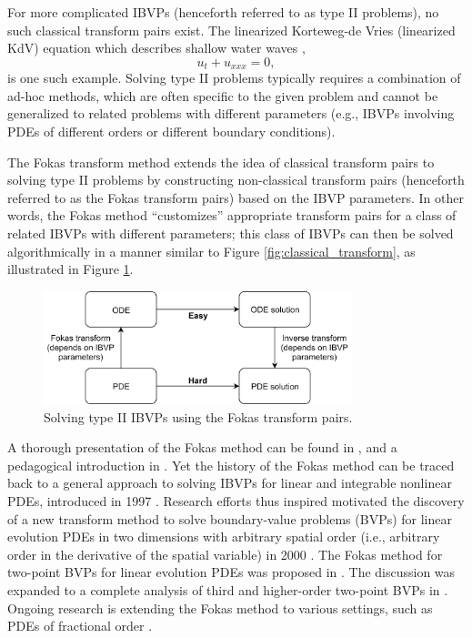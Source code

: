 \documentclass[12pt, oneside, a4paper]{article}
\begin{document}
For more complicated IBVPs (henceforth referred to as type II problems), no such classical transform pairs exist. The linearized Korteweg-de Vries (linearized KdV) equation which describes shallow water waves \cite{Korteweg1895},
\begin{equation}\label{eq:linearied_kdv}
    u_t + u_{xxx} = 0,
\end{equation}
is one such example. Solving type II problems typically requires a combination of ad-hoc methods, which are often specific to the given problem and cannot be generalized to related problems with different parameters (e.g., IBVPs involving PDEs of different orders or different boundary conditions).

The Fokas transform method extends the idea of classical transform pairs to solving type II problems by constructing non-classical transform pairs (henceforth referred to as the Fokas transform pairs) based on the IBVP parameters. In other words, the Fokas method ``customizes'' appropriate transform pairs for a class of related IBVPs with different parameters; this class of IBVPs can then be solved algorithmically in a manner similar to Figure \ref{fig:classical_transform}, as illustrated in Figure \ref{fig:fokas_transform}.
\begin{figure}[htpb!]
    \centering
    \includegraphics[width=0.8\textwidth]{fokas_transform.png}
    \caption{Solving type II IBVPs using the Fokas transform pairs.}
    \label{fig:fokas_transform}
\end{figure}

A thorough presentation of the Fokas method can be found in \cite{Fokas2008}, and a pedagogical introduction in \cite{Deconinck2014}. Yet the history of the Fokas method can be traced back to a general approach to solving IBVPs for linear and integrable nonlinear PDEs, introduced in 1997 \cite{Fokas1997}. Research efforts thus inspired motivated the discovery of a new transform method to solve boundary-value problems (BVPs) for linear evolution PDEs in two dimensions with arbitrary spatial order (i.e., arbitrary order in the derivative of the spatial variable) in 2000 \cite{Fokas2000}. The Fokas method for two-point BVPs for linear evolution PDEs was proposed in \cite{Fokas2001}. The discussion was expanded to a complete analysis of third and higher-order two-point BVPs in \cite{Smith2012}. Ongoing research is extending the Fokas method to various settings, such as PDEs of fractional order \cite{Fernandez2018}.
\end{document}
